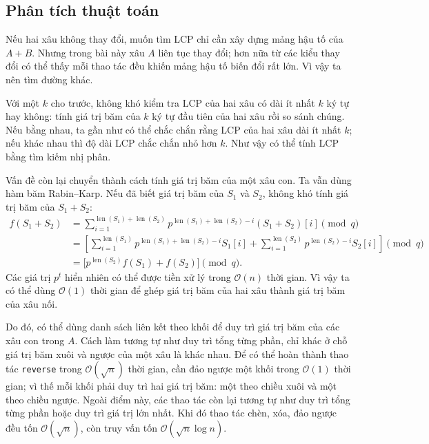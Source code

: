 \documentclass[11pt]{article}
\newcommand{\Oh}{\mathcal{O}}
\begin{document}
\subsection{Phân tích thuật toán}

Nếu hai xâu không thay đổi, muốn tìm LCP chỉ cần xây dựng mảng hậu tố của
$A+B$. Nhưng trong bài này xâu $A$ liên tục thay đổi; hơn nữa từ các kiểu
thay đổi có thể thấy mỗi thao tác đều khiến mảng hậu tố biến đổi rất lớn. Vì
vậy ta nên tìm đường khác.

Với một $k$ cho trước, không khó kiểm tra LCP của hai xâu có dài ít nhất $k$
ký tự hay không: tính giá trị băm của $k$ ký tự đầu tiên của hai xâu rồi so
sánh chúng. Nếu bằng nhau, ta gần như có thể chắc chắn rằng LCP của hai xâu
dài ít nhất $k$; nếu khác nhau thì độ dài LCP chắc chắn nhỏ hơn $k$. Như vậy
có thể tính LCP bằng tìm kiếm nhị phân.

Vấn đề còn lại chuyển thành cách tính giá trị băm của một xâu con. Ta vẫn
dùng hàm băm Rabin--Karp. Nếu đã biết giá trị băm của $S_1$ và $S_2$, không
khó tính giá trị băm của $S_1+S_2$:
\[
\begin{aligned}
  f(S_1+S_2)
  &=
  \sum_{i=1}^{\operatorname{len}(S_1)+\operatorname{len}(S_2)}
  p^{\operatorname{len}(S_1)+\operatorname{len}(S_2)-i}
  (S_1+S_2)[i]\pmod q\\
  &=
  \left[
    \sum_{i=1}^{\operatorname{len}(S_1)}
    p^{\operatorname{len}(S_1)+\operatorname{len}(S_2)-i}S_1[i]
    +
    \sum_{i=1}^{\operatorname{len}(S_2)}
    p^{\operatorname{len}(S_2)-i}S_2[i]
  \right]\pmod q\\
  &=
  \bigl[
    p^{\operatorname{len}(S_2)}f(S_1)+f(S_2)
  \bigr]\pmod q.
\end{aligned}
\]
Các giá trị $p^t$ hiển nhiên có thể được tiền xử lý trong $\Oh(n)$ thời gian.
Vì vậy ta có thể dùng $\Oh(1)$ thời gian để ghép giá trị băm của hai xâu
thành giá trị băm của xâu nối.

Do đó, có thể dùng danh sách liên kết theo khối để duy trì giá trị băm của
các xâu con trong $A$. Cách làm tương tự như duy trì tổng từng phần, chỉ khác
ở chỗ giá trị băm xuôi và ngược của một xâu là khác nhau. Để có thể hoàn
thành thao tác \texttt{reverse} trong $\Oh(\sqrt n)$ thời gian, cần đảo ngược
một khối trong $\Oh(1)$ thời gian; vì thế mỗi khối phải duy trì hai giá trị
băm: một theo chiều xuôi và một theo chiều ngược. Ngoài điểm này, các thao
tác còn lại tương tự như duy trì tổng từng phần hoặc duy trì giá trị lớn
nhất. Khi đó thao tác chèn, xóa, đảo ngược đều tốn $\Oh(\sqrt n)$, còn truy
vấn tốn $\Oh(\sqrt n\log n)$.
\end{document}
